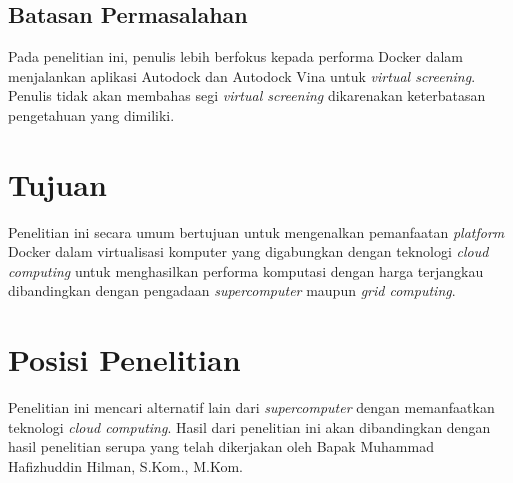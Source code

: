 \subsection{Batasan Permasalahan}
\hspace{0.5cm}Pada penelitian ini, penulis lebih berfokus kepada performa Docker dalam menjalankan aplikasi Autodock dan Autodock Vina untuk \textit{virtual screening}. Penulis tidak akan membahas segi \textit{virtual screening} dikarenakan keterbatasan pengetahuan yang dimiliki. 

\section{Tujuan}
\hspace{0.5cm}Penelitian ini secara umum bertujuan untuk mengenalkan pemanfaatan \textit{platform} Docker dalam virtualisasi komputer yang digabungkan dengan teknologi \textit{cloud computing} untuk menghasilkan performa komputasi dengan harga terjangkau dibandingkan dengan pengadaan \textit{supercomputer} maupun \textit{grid computing}.


\section{Posisi Penelitian}
\hspace{0.5cm}Penelitian ini mencari alternatif lain dari \textit{supercomputer} dengan memanfaatkan teknologi \textit{cloud computing}. Hasil dari penelitian ini akan dibandingkan dengan hasil penelitian serupa yang telah dikerjakan oleh Bapak Muhammad Hafizhuddin Hilman, S.Kom., M.Kom.

